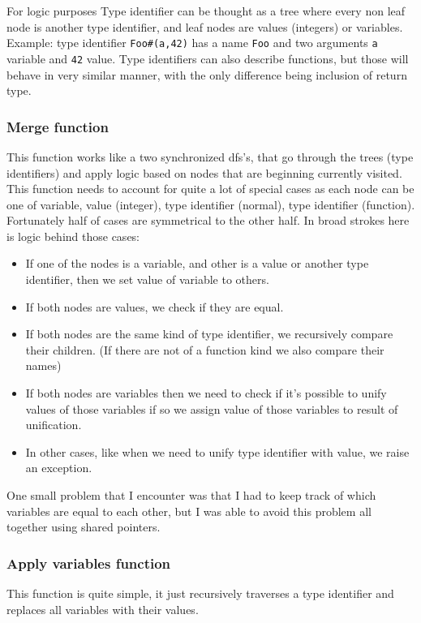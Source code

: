 \documentclass[14pt]{report}
\begin{document}
For logic purposes Type identifier can be thought as a tree where every non leaf node is another type identifier, and leaf nodes are values (integers) or variables. 
Example: type identifier \verb!Foo#(a,42)! has a name \verb!Foo! and two arguments \verb!a! variable and \verb!42! value. Type identifiers can also describe functions, but those will behave in very similar manner, with the only difference being inclusion of return type.

\subsubsection{Merge function}
This function works like a two synchronized dfs's, that go through the trees (type identifiers) and apply logic based on nodes that are beginning currently visited.
This function needs to account for quite a lot of special cases as each node can be one of variable, value (integer), type identifier (normal), type identifier (function). Fortunately half of cases are symmetrical to the other half. In broad strokes here is logic behind those cases:
\begin{itemize}
    \item If one of the nodes is a variable, and other is a value or another type identifier, then we set value of variable to others.
    \item If both nodes are values, we check if they are equal.
    \item If both nodes are the same kind of type identifier, we recursively compare their children. (If there are not of a function kind we also compare their names)
    \item If both nodes are variables then we need to check if it's possible to unify values of those variables if so we assign value of those variables to result of unification.
    \item In other cases, like when we need to unify type identifier with value, we raise an exception.
\end{itemize}
One small problem that I encounter was that I had to keep track of which variables are equal to each other, but I was able to avoid this problem all together using shared pointers.
\subsubsection{Apply variables function}
This function is quite simple, it just recursively traverses a type identifier and replaces all variables with their values.
\end{document}
